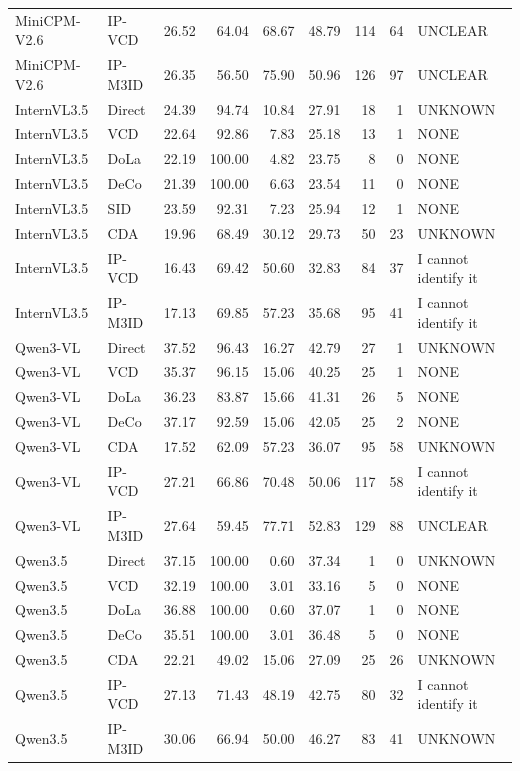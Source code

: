 \begin{longtable}{llrrrrrrl}
MiniCPM-V2.6 & IP-VCD & 26.52 & 64.04 & 68.67 & 48.79 & 114 & 64 & UNCLEAR\\
MiniCPM-V2.6 & IP-M3ID & 26.35 & 56.50 & 75.90 & 50.96 & 126 & 97 & UNCLEAR\\
InternVL3.5 & Direct & 24.39 & 94.74 & 10.84 & 27.91 & 18 & 1 & UNKNOWN\\
InternVL3.5 & VCD & 22.64 & 92.86 & 7.83 & 25.18 & 13 & 1 & NONE\\
InternVL3.5 & DoLa & 22.19 & 100.00 & 4.82 & 23.75 & 8 & 0 & NONE\\
InternVL3.5 & DeCo & 21.39 & 100.00 & 6.63 & 23.54 & 11 & 0 & NONE\\
InternVL3.5 & SID & 23.59 & 92.31 & 7.23 & 25.94 & 12 & 1 & NONE\\
InternVL3.5 & CDA & 19.96 & 68.49 & 30.12 & 29.73 & 50 & 23 & UNKNOWN\\
InternVL3.5 & IP-VCD & 16.43 & 69.42 & 50.60 & 32.83 & 84 & 37 & I cannot identify it\\
InternVL3.5 & IP-M3ID & 17.13 & 69.85 & 57.23 & 35.68 & 95 & 41 & I cannot identify it\\
Qwen3-VL & Direct & 37.52 & 96.43 & 16.27 & 42.79 & 27 & 1 & UNKNOWN\\
Qwen3-VL & VCD & 35.37 & 96.15 & 15.06 & 40.25 & 25 & 1 & NONE\\
Qwen3-VL & DoLa & 36.23 & 83.87 & 15.66 & 41.31 & 26 & 5 & NONE\\
Qwen3-VL & DeCo & 37.17 & 92.59 & 15.06 & 42.05 & 25 & 2 & NONE\\
Qwen3-VL & CDA & 17.52 & 62.09 & 57.23 & 36.07 & 95 & 58 & UNKNOWN\\
Qwen3-VL & IP-VCD & 27.21 & 66.86 & 70.48 & 50.06 & 117 & 58 & I cannot identify it\\
Qwen3-VL & IP-M3ID & 27.64 & 59.45 & 77.71 & 52.83 & 129 & 88 & UNCLEAR\\
Qwen3.5 & Direct & 37.15 & 100.00 & 0.60 & 37.34 & 1 & 0 & UNKNOWN\\
Qwen3.5 & VCD & 32.19 & 100.00 & 3.01 & 33.16 & 5 & 0 & NONE\\
Qwen3.5 & DoLa & 36.88 & 100.00 & 0.60 & 37.07 & 1 & 0 & NONE\\
Qwen3.5 & DeCo & 35.51 & 100.00 & 3.01 & 36.48 & 5 & 0 & NONE\\
Qwen3.5 & CDA & 22.21 & 49.02 & 15.06 & 27.09 & 25 & 26 & UNKNOWN\\
Qwen3.5 & IP-VCD & 27.13 & 71.43 & 48.19 & 42.75 & 80 & 32 & I cannot identify it\\
Qwen3.5 & IP-M3ID & 30.06 & 66.94 & 50.00 & 46.27 & 83 & 41 & UNKNOWN\\

\end{longtable}
